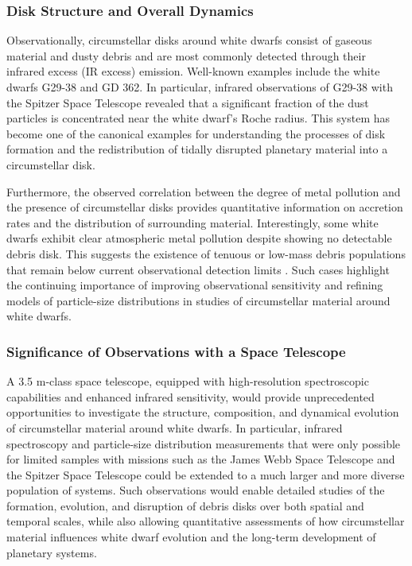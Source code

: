 \subsubsection{Disk Structure and Overall Dynamics}

Observationally, circumstellar disks around white dwarfs consist of gaseous material and dusty debris and are most commonly detected through their infrared excess (IR excess) emission. Well-known examples include the white dwarfs G29-38 and GD 362. In particular, infrared observations of G29-38 with the Spitzer Space Telescope revealed that a significant fraction of the dust particles is concentrated near the white dwarf's Roche radius. This system has become one of the canonical examples for understanding the processes of disk formation and the redistribution of tidally disrupted planetary material into a circumstellar disk.

Furthermore, the observed correlation between the degree of metal pollution and the presence of circumstellar disks provides quantitative information on accretion rates and the distribution of surrounding material. Interestingly, some white dwarfs exhibit clear atmospheric metal pollution despite showing no detectable debris disk. This suggests the existence of tenuous or low-mass debris populations that remain below current observational detection limits \cite{rocchetto2015}. Such cases highlight the continuing importance of improving observational sensitivity and refining models of particle-size distributions in studies of circumstellar material around white dwarfs.

\subsubsection{Significance of Observations with a Space Telescope}

A 3.5 m-class space telescope, equipped with high-resolution spectroscopic capabilities and enhanced infrared sensitivity, would provide unprecedented opportunities to investigate the structure, composition, and dynamical evolution of circumstellar material around white dwarfs. In particular, infrared spectroscopy and particle-size distribution measurements that were only possible for limited samples with missions such as the James Webb Space Telescope and the Spitzer Space Telescope could be extended to a much larger and more diverse population of systems. Such observations would enable detailed studies of the formation, evolution, and disruption of debris disks over both spatial and temporal scales, while also allowing quantitative assessments of how circumstellar material influences white dwarf evolution and the long-term development of planetary systems.

